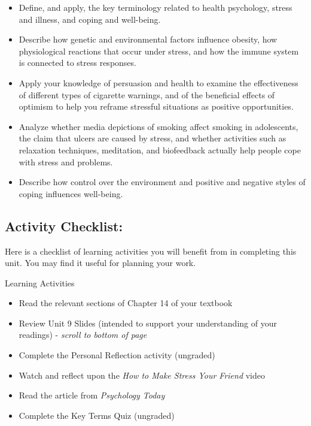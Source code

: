 \documentclass[
]{book}
\providecommand{\tightlist}{%
  \setlength{\itemsep}{0pt}\setlength{\parskip}{0pt}}
\begin{document}
\begin{itemize}
\tightlist
\item
  Define, and apply, the key terminology related to health psychology, stress and illness, and coping and well-being.\\
\item
  Describe how genetic and environmental factors influence obesity, how physiological reactions that occur under stress, and how the immune system is connected to stress responses.\\
\item
  Apply your knowledge of persuasion and health to examine the effectiveness of different types of cigarette warnings, and of the beneficial effects of optimism to help you reframe stressful situations as positive opportunities.\\
\item
  Analyze whether media depictions of smoking affect smoking in adolescents, the claim that ulcers are caused by stress, and whether activities such as relaxation techniques, meditation, and biofeedback actually help people cope with stress and problems.\\
\item
  Describe how control over the environment and positive and negative styles of coping influences well-being.
\end{itemize}

\hypertarget{activity-checklist-8}{%
\subsection*{Activity Checklist:}\label{activity-checklist-8}}

Here is a checklist of learning activities you will benefit from in completing this unit. You may find it useful for planning your work.

\begin{reflect}
{Learning Activities}

\begin{itemize}
\tightlist
\item
  Read the relevant sections of Chapter 14 of your textbook
\item
  Review Unit 9 Slides (intended to support your understanding of your readings) - \emph{scroll to bottom of page}
\item
  Complete the Personal Reflection activity (ungraded)
\item
  Watch and reflect upon the \emph{How to Make Stress Your Friend} video
\item
  Read the article from \emph{Psychology Today}
\item
  Complete the Key Terms Quiz (ungraded)
\end{itemize}
\end{reflect}
\end{document}
